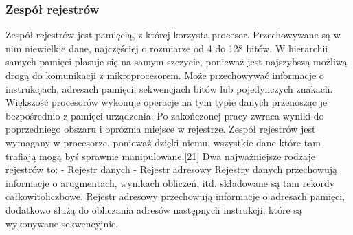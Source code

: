 \documentclass[12pt, a4paper, onside, polish]{article}				%
\begin{document}
\subsubsection{Zespół rejestrów}
\hspace{\parindent}
Zespół rejestrów jest pamięcią, z której korzysta procesor. Przechowywane są w nim niewielkie dane, najczęściej o rozmiarze od 4 do 128 bitów. W hierarchii samych pamięci plasuje się na samym szczycie, ponieważ jest najszybszą możliwą drogą do komunikacji z mikroprocesorem. Może przechowywać informacje o instrukcjach, adresach pamięci, sekwencjach bitów lub pojedynczych znakach.  Większość procesorów wykonuje operacje na tym typie danych przenosząc je bezpośrednio z pamięci urządzenia. Po zakończonej pracy zwraca wyniki do poprzedniego obszaru i opróżnia miejsce w rejestrze. Zespół rejestrów jest wymagany w procesorze, ponieważ dzięki niemu, wszystkie dane które tam trafiają mogą byś sprawnie manipulowane.[21]  \newline\newline
Dwa najważniejsze rodzaje rejestrów to: \newline
- Rejestr danych \newline
- Rejestr adresowy \newline\newline
 Rejestry danych przechowują informacje o arugmentach, wynikach obliczeń, itd.  składowane są tam rekordy całkowitoliczbowe.  \newline\newline
Rejestr adresowy przechowują informacje o adresach pamięci, dodatkowo służą do obliczania adresów następnych instrukcji, które są wykonywane sekwencyjnie. 
\end{document}

